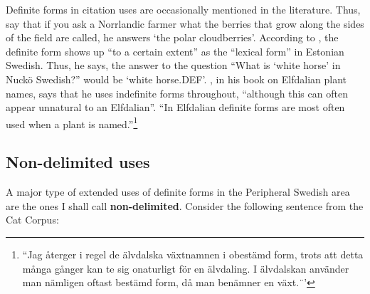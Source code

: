 \z

Definite forms in citation uses are occasionally mentioned in the literature. Thus, \citet[282]{ÅgrenEtAl1954} say that if you ask a Norrlandic farmer what the berries that grow along the sides of the field are called, he answers  ‘the polar cloudberries’. According to \citet[82]{Lagman1979}, the definite form shows up “to a certain extent” as the “lexical form” in Estonian Swedish. Thus, he says, the answer to the question “What is ‘white horse’ in Nuckö Swedish?” would be  ‘white horse.DEF’. \citet[8]{Steensland1994}, in his book on Elfdalian plant names, says that he uses indefinite forms throughout, “although this can often appear unnatural to an Elfdalian”.  “In Elfdalian definite forms are most often used when a plant is named.”\footnote{ “Jag återger i regel de älvdalska växtnamnen i obestämd form, trots att detta många gånger kan te sig onaturligt för en älvdaling. I älvdalskan använder man nämligen oftast bestämd form, då man benämner en växt.¨’}

\subsection{ Non-delimited uses}
\label{bkm:Ref105226557}

A major type of extended uses of definite forms in the Peripheral Swedish area are the ones I shall call \textbf{non-delimited}. Consider the following sentence from the Cat Corpus: 

\ea 
	\z 
\z

